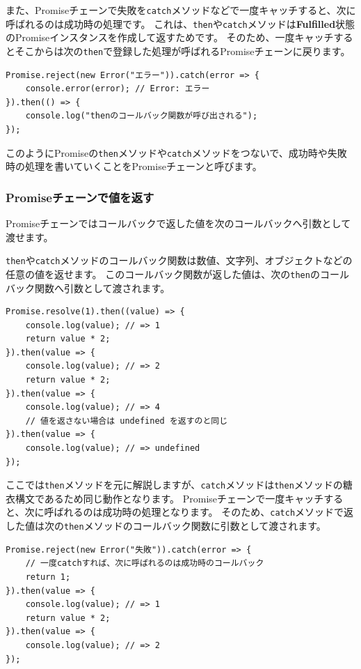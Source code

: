 また、Promiseチェーンで失敗を\texttt{catch}メソッドなどで一度キャッチすると、次に呼ばれるのは成功時の処理です。
これは、\texttt{then}や\texttt{catch}メソッドは\textbf{Fulfilled}状態のPromiseインスタンスを作成して返すためです。
そのため、一度キャッチするとそこからは次の\texttt{then}で登録した処理が呼ばれるPromiseチェーンに戻ります。

\begin{lstlisting}
Promise.reject(new Error("エラー")).catch(error => {
    console.error(error); // Error: エラー
}).then(() => {
    console.log("thenのコールバック関数が呼び出される");
});
\end{lstlisting}

このようにPromiseの\texttt{then}メソッドや\texttt{catch}メソッドをつないで、成功時や失敗時の処理を書いていくことをPromiseチェーンと呼びます。\enlargethispage{\baselineskip}

\hypertarget{promise-chain-value}{%
\subsubsection{Promiseチェーンで値を返す}\label{promise-chain-value}}

Promiseチェーンではコールバックで返した値を次のコールバックへ引数として渡せます。

\texttt{then}や\texttt{catch}メソッドのコールバック関数は数値、文字列、オブジェクトなどの任意の値を返せます。
このコールバック関数が返した値は、次の\texttt{then}のコールバック関数へ引数として渡されます。

\begin{lstlisting}
Promise.resolve(1).then((value) => {
    console.log(value); // => 1
    return value * 2;
}).then(value => {
    console.log(value); // => 2
    return value * 2;
}).then(value => {
    console.log(value); // => 4
    // 値を返さない場合は undefined を返すのと同じ
}).then(value => {
    console.log(value); // => undefined
});
\end{lstlisting}

ここでは\texttt{then}メソッドを元に解説しますが、\texttt{catch}メソッドは\texttt{then}メソッドの糖衣構文であるため同じ動作となります。
Promiseチェーンで一度キャッチすると、次に呼ばれるのは成功時の処理となります。
そのため、\texttt{catch}メソッドで返した値は次の\texttt{then}メソッドのコールバック関数に引数として渡されます。

\begin{lstlisting}
Promise.reject(new Error("失敗")).catch(error => { 
    // 一度catchすれば、次に呼ばれるのは成功時のコールバック
    return 1;
}).then(value => {
    console.log(value); // => 1
    return value * 2;
}).then(value => {
    console.log(value); // => 2
});
\end{lstlisting}

